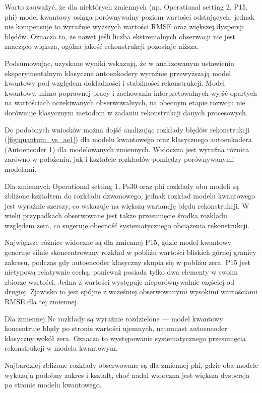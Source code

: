 Warto zauważyć, że dla niektórych zmiennych (np. Operational setting 2, P15, phi) model kwantowy osiąga porównywalny poziom wartości odstających, jednak nie kompensuje to wyraźnie wyższych wartości RMSE oraz większej dyspersji błędów. Oznacza to, że nawet jeśli liczba ekstremalnych obserwacji nie jest znacząco większa, ogólna jakość rekonstrukcji pozostaje niższa.

Podsumowując, uzyskane wyniki wskazują, że w analizowanym ustawieniu eksperymentalnym klasyczne autoenkodery wyraźnie przewyższają model kwantowy pod względem dokładności i stabilności rekonstrukcji. Model kwantowy, mimo poprawnej pracy i zachowania interpretowalnych wyjść opartych na wartościach oczekiwanych obserwowalnych, na obecnym etapie rozwoju nie dorównuje klasycznym metodom w zadaniu rekonstrukcji danych procesowych.

Do podobnych wniosków można dojść analizując rozkłady błędów rekonstrukcji (\ref{fig:quantum_vs_ae1}) dla modelu kwantowego oraz klasycznego autoenkodera (Autoencoder 1) dla modelowanych zmiennych. Widoczna jest wyraźna różnica zarówno w położeniu, jak i kształcie rozkładów pomiędzy porównywanymi modelami.

Dla zmiennych Operational setting 1, Ps30 oraz phi rozkłady obu modeli są zbliżone kształtem do rozkładu dzwonowego, jednak rozkład modelu kwantowego jest wyraźnie szerszy, co wskazuje na większą wariancję błędu rekonstrukcji. W wielu przypadkach obserwowane jest także przesunięcie środka rozkładu względem zera, co sugeruje obecność systematycznego obciążenia rekonstrukcji.

Największe różnice widoczne są dla zmiennej P15, gdzie model kwantowy generuje silnie skoncentrowany rozkład w pobliżu wartości bliskich górnej granicy zakresu, podczas gdy autoencoder klasyczny skupia się w pobliżu zera. P15 jest nietypową relatywnie cechą, ponieważ posiada tylko dwa elementy w swoim zbiorze wartości. Jedna z wartości występuje nieporównywalnie częściej od drugiej. Zjawisko to jest spójne z wcześniej obserwowanymi wysokimi wartościami RMSE dla tej zmiennej.

Dla zmiennej Nc rozkłady są wyraźnie rozdzielone — model kwantowy koncentruje błędy po stronie wartości ujemnych, natomiast autoencoder klasyczny wokół zera. Oznacza to występowanie systematycznego przesunięcia rekonstrukcji w modelu kwantowym.

Najbardziej zbliżone rozkłady obserwowane są dla zmiennej phi, gdzie oba modele wykazują podobny zakres i kształt, choć nadal widoczna jest większa dyspersja po stronie modelu kwantowego.

